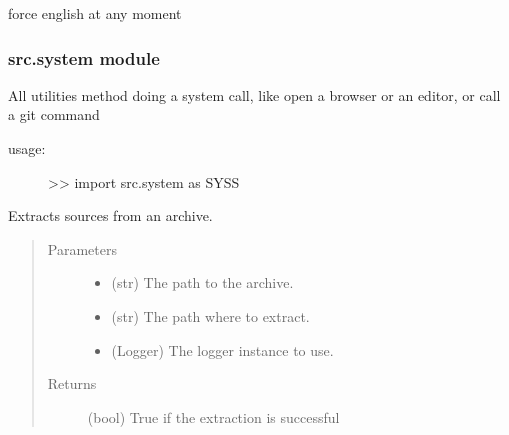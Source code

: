 \documentclass[a4paper,10pt,english]{sphinxmanual}
\begin{document}

\begin{fulllineitems}
\label{\detokenize{apidoc_src/src:src.salomeTools.setNotLocale}}
force english at any moment

\end{fulllineitems}



\subsubsection{src.system module}
\label{\detokenize{apidoc_src/src:src-system-module}}\label{\detokenize{apidoc_src/src:module-src.system}}
All utilities method doing a system call, 
like open a browser or an editor, or call a git command
\begin{description}
\item[{usage:}] \leavevmode
\textgreater{}\textgreater{} import src.system as SYSS

\end{description}

\begin{fulllineitems}
\label{\detokenize{apidoc_src/src:src.system.archive_extract}}
Extracts sources from an archive.
\begin{quote}\begin{description}
\item[{Parameters}] \leavevmode\begin{itemize}
\item {} 
 \textendash{} (str) The path to the archive.

\item {} 
 \textendash{} (str) The path where to extract.

\item {} 
 \textendash{} (Logger) The logger instance to use.

\end{itemize}

\item[{Returns}] \leavevmode
(bool) True if the extraction is successful

\end{description}\end{quote}

\end{fulllineitems}
\end{document}
